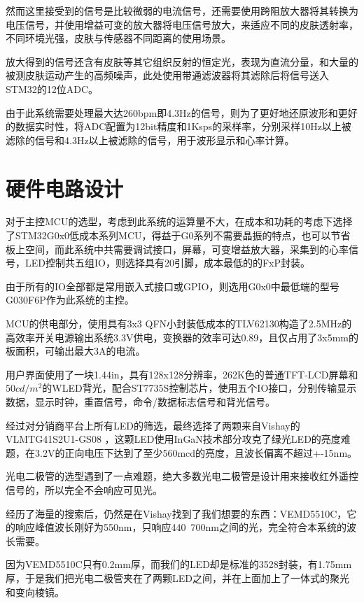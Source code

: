 \documentclass[a4paper]{ctexart}
\begin{document}
	然而这里接受到的信号是比较微弱的电流信号，还需要使用跨阻放大器将其转换为电压信号，并使用增益可变的放大器将电压信号放大，来适应不同的皮肤透射率，不同环境光强，皮肤与传感器不同距离的使用场景。
	
	放大得到的信号还含有皮肤等其它组织反射的恒定光，表现为直流分量，和大量的被测皮肤运动产生的高频噪声，此处使用带通滤波器将其滤除后将信号送入STM32的12位ADC。
	
	由于此系统需要处理最大达260bpm即4.3Hz的信号，则为了更好地还原波形和更好的数据实时性，将ADC配置为12bit精度和1Ksps的采样率，分别采样10Hz以上被滤除的信号和4.3Hz以上被滤除的信号，用于波形显示和心率计算。
	
	\cite{Activity:HRM Circuit}
	\cite{HRM Circuit}

\newpage
\section{硬件电路设计}

	对于主控MCU的选型，考虑到此系统的运算量不大，在成本和功耗的考虑下选择了STM32G0x0低成本系列MCU，得益于G0系列不需要晶振的特点，也可以节省板上空间，而此系统中共需要调试接口，屏幕，可变增益放大器，采集到的心率信号，LED控制共五组IO，则选择具有20引脚，成本最低的的FxP封装。
	
	由于所有的IO全部都是常用嵌入式接口或GPIO，则选用G0x0中最低端的型号G030F6P作为此系统的主控。
	
	MCU的供电部分，使用具有3x3 QFN小封装低成本的TLV62130构造了2.5MHz的高效率开关电源输出系统3.3V供电，变换器的效率可达0.89，且仅占用了3x5mm的板面积，可输出最大3A的电流。
	
	用户界面使用了一块1.44in，具有128x128分辨率，262K色的普通TFT-LCD屏幕和 $50cd/m^2$的WLED背光，配合ST7735S控制芯片，使用五个IO接口，分别传输显示数据，显示时钟，重置信号，命令/数据标志信号和背光信号。
	
	经过对分销商平台上所有LED的筛选，最终选择了两颗来自Vishay的 VLMTG41S2U1-GS08 ，这颗LED使用InGaN技术部分攻克了绿光LED的亮度难题，在3.2V的正向电压下达到了至少560mcd的亮度，且波长偏离不超过+-15nm。
	
	光电二极管的选型遇到了一点难题，绝大多数光电二极管是设计用来接收红外遥控信号的，所以完全不会响应可见光。
	
	经历了海量的搜索后，仍然是在Vishay找到了我们想要的东西：VEMD5510C，它的响应峰值波长刚好为550nm，只响应440~700nm之间的光，完全符合本系统的波长需要。
	
	因为VEMD5510C只有0.2mm厚，而我们的LED却是标准的3528封装，有1.75mm厚，于是我们把光电二极管夹在了两颗LED之间，并在上面加上了一体式的聚光和变向棱镜。
	
\end{document}
